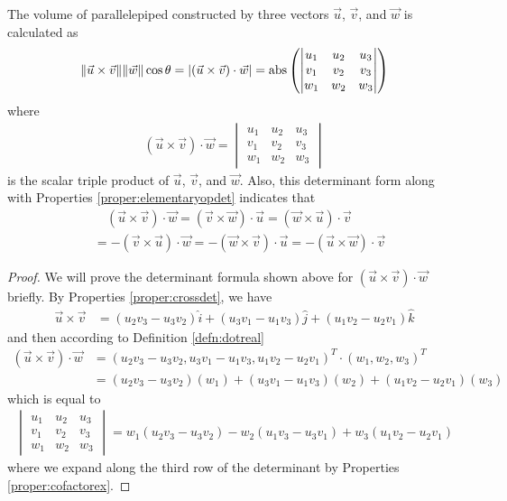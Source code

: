 \begin{proper}
\label{proper:parallelpiped}
The volume of parallelepiped constructed by three vectors $\vec{u}$, $\vec{v}$, and $\vec{w}$ is calculated as
\begin{align*}
\norm{\vec{u} \times \vec{v}} \norm{\vec{w}} \cos\theta = |(\vec{u} \times \vec{v}) \cdot \vec{w}| =
\text{abs}\left(
\begin{vmatrix}
u_1 & u_2 & u_3 \\
v_1 & v_2 & v_3 \\
w_1 & w_2 & w_3
\end{vmatrix}\right)
\end{align*}
where
\begin{align*}
(\vec{u} \times \vec{v}) \cdot \vec{w} =
\begin{vmatrix}
u_1 & u_2 & u_3 \\
v_1 & v_2 & v_3 \\
w_1 & w_2 & w_3
\end{vmatrix}    
\end{align*}
is the scalar triple product of $\vec{u}$, $\vec{v}$, and $\vec{w}$. Also, this determinant form along with Properties \ref{proper:elementaryopdet} indicates that
\begin{align*}
&\quad (\vec{u} \times \vec{v}) \cdot \vec{w} = (\vec{v} \times \vec{w}) \cdot \vec{u} = (\vec{w} \times \vec{u}) \cdot \vec{v} \\
&= -(\vec{v} \times \vec{u}) \cdot \vec{w} = -(\vec{w} \times \vec{v}) \cdot \vec{u} = -(\vec{u} \times \vec{w}) \cdot \vec{v}
\end{align*}
\end{proper}
\begin{proof}
We will prove the determinant formula shown above for $(\vec{u} \times \vec{v}) \cdot \vec{w}$ briefly. By Properties \ref{proper:crossdet}, we have
\begin{align*}
\vec{u} \times \vec{v} &= (u_2v_3 - u_3v_2)\hat{i} + (u_3v_1 - u_1v_3)\hat{j} + (u_1v_2 - u_2v_1)\hat{k}     
\end{align*}
and then according to Definition \ref{defn:dotreal}
\begin{align*}
(\vec{u} \times \vec{v}) \cdot \vec{w} &= (u_2v_3 - u_3v_2, u_3v_1 - u_1v_3, u_1v_2 - u_2v_1)^T \cdot (w_1, w_2, w_3)^T \\ 
&= (u_2v_3 - u_3v_2)(w_1) + (u_3v_1 - u_1v_3)(w_2) + (u_1v_2 - u_2v_1)(w_3) 
\end{align*}
which is equal to
\begin{align*}
\begin{vmatrix}
u_1 & u_2 & u_3 \\
v_1 & v_2 & v_3 \\
w_1 & w_2 & w_3
\end{vmatrix}
= w_1(u_2v_3 - u_3v_2) - w_2(u_1v_3 - u_3v_1) + w_3(u_1v_2 - u_2v_1) 
\end{align*}
where we expand along the third row of the determinant by Properties \ref{proper:cofactorex}.
\end{proof}
